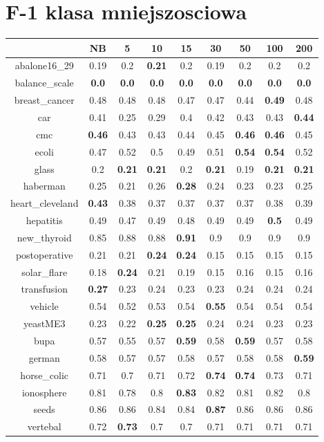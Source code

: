 \documentclass{article}%
\begin{document}
%
\section*{F{-}1 klasa mniejszosciowa}%
\begin{tabular}{c|cccccccc}%
\hline%
&NB&5&10&15&30&50&100&200\\%
\hline%
abalone16\_29&0.19&0.2&\textbf{0.21}&0.2&0.19&0.2&0.2&0.2\\%
\hline%
balance\_scale&\textbf{0.0}&\textbf{0.0}&\textbf{0.0}&\textbf{0.0}&\textbf{0.0}&\textbf{0.0}&\textbf{0.0}&\textbf{0.0}\\%
\hline%
breast\_cancer&0.48&0.48&0.48&0.47&0.47&0.44&\textbf{0.49}&0.48\\%
\hline%
car&0.41&0.25&0.29&0.4&0.42&0.43&0.43&\textbf{0.44}\\%
\hline%
cmc&\textbf{0.46}&0.43&0.43&0.44&0.45&\textbf{0.46}&\textbf{0.46}&0.45\\%
\hline%
ecoli&0.47&0.52&0.5&0.49&0.51&\textbf{0.54}&\textbf{0.54}&0.52\\%
\hline%
glass&0.2&\textbf{0.21}&\textbf{0.21}&0.2&\textbf{0.21}&0.19&\textbf{0.21}&\textbf{0.21}\\%
\hline%
haberman&0.25&0.21&0.26&\textbf{0.28}&0.24&0.23&0.23&0.25\\%
\hline%
heart\_cleveland&\textbf{0.43}&0.38&0.37&0.37&0.37&0.37&0.38&0.39\\%
\hline%
hepatitis&0.49&0.47&0.49&0.48&0.49&0.49&\textbf{0.5}&0.49\\%
\hline%
new\_thyroid&0.85&0.88&0.88&\textbf{0.91}&0.9&0.9&0.9&0.9\\%
\hline%
postoperative&0.21&0.21&\textbf{0.24}&\textbf{0.24}&0.15&0.15&0.15&0.15\\%
\hline%
solar\_flare&0.18&\textbf{0.24}&0.21&0.19&0.15&0.16&0.15&0.16\\%
\hline%
transfusion&\textbf{0.27}&0.23&0.24&0.23&0.23&0.24&0.24&0.24\\%
\hline%
vehicle&0.54&0.52&0.53&0.54&\textbf{0.55}&0.54&0.54&0.54\\%
\hline%
yeastME3&0.23&0.22&\textbf{0.25}&\textbf{0.25}&0.24&0.24&0.23&0.23\\%
\hline%
bupa&0.57&0.55&0.57&\textbf{0.59}&0.58&\textbf{0.59}&0.57&0.58\\%
\hline%
german&0.58&0.57&0.57&0.58&0.57&0.58&0.58&\textbf{0.59}\\%
\hline%
horse\_colic&0.71&0.7&0.71&0.72&\textbf{0.74}&\textbf{0.74}&0.73&0.71\\%
\hline%
ionosphere&0.81&0.78&0.8&\textbf{0.83}&0.82&0.81&0.82&0.8\\%
\hline%
seeds&0.86&0.86&0.84&0.84&\textbf{0.87}&0.86&0.86&0.86\\%
\hline%
vertebal&0.72&\textbf{0.73}&0.7&0.7&0.71&0.71&0.71&0.71\\%
\hline%
\end{tabular}
\end{document}
